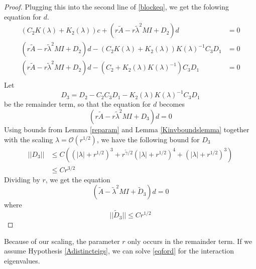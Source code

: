 \documentclass[thesis.tex]{subfiles}
\begin{document}
\begin{lemma}
\begin{proof}
Plugging this into the second line of \eqref{blockeq}, we get the folowing equation for $d$.
\begin{align*}
(C_2 K(\lambda) + K_2(\lambda))c + (r\tilde{A} - r \tilde{\lambda}^2 MI + D_2)d &= 0 \\
(r\tilde{A} - r \tilde{\lambda}^2 MI + D_2)d - (C_2 K(\lambda) + K_2(\lambda))K(\lambda)^{-1} C_3 D_1 &= 0 \\
(r\tilde{A} - r \tilde{\lambda}^2 MI + D_2)d - (C_2 + K_2(\lambda)K(\lambda)^{-1}) C_3 D_1 &= 0 \\
\end{align*}
Let 
\[
D_3 = D_2 - C_2 C_3 D_1 - K_2(\lambda) K(\lambda)^{-1} C_3 D_1
\]
be the remainder term, so that the equation for $d$ becomes
\[
(r\tilde{A} - r \tilde{\lambda}^2 MI + D_3)d = 0
\]
Using bounds from Lemma \ref{reparam} and Lemma \ref{Kinvboundslemma} together with the scaling $\lambda = \mathcal{O}(r^{1/2})$, we have the following bound for $D_3$
\begin{align*}
||D_3|| &\leq C \left( (|\lambda| + r^{1/2})^3 + r^{\tilde{\gamma}/2}(|\lambda| + r^{1/2})^4 + (|\lambda| + r^{1/2})^3 \right) \\
&\leq C r^{3/2}
\end{align*}
Dividing by $r$, we get the equation 
\[
(\tilde{A} - \tilde{\lambda}^2 MI + \tilde{D}_3)d = 0
\]
where 
\[
||\tilde{D}_3|| \leq C r^{1/2}
\]
\end{proof}
\end{lemma}

Because of our scaling, the parameter $r$ only occurs in the remainder term. If we assume Hypothesis \ref{Adistincteigs}, we can solve \eqref{eqford} for the interaction eigenvalues.
\end{document}
